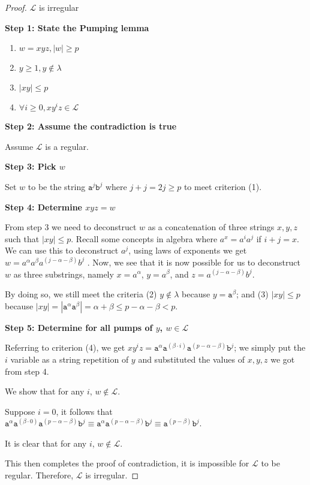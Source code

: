 \begin{proof}
    $\mathcal{L}$ is irregular

    \textbf{Step 1: State the Pumping lemma}
    \begin{enumerate}
        \item $w=xyz, |w| \geq p$
        \item $y\geq 1, y\notin\lambda$
        \item $|xy|\leq p$
        \item $\forall i\geq 0, xy^iz\in\mathcal{L}$
    \end{enumerate}
    
    \textbf{Step 2: Assume the contradiction is true}
    
    Assume $\mathcal{L}$ is a regular. 
    
    \textbf{Step 3: Pick $w$}
    
    Set $w$ to be the string $\texttt{a}^j \texttt{b}^j$ where $j+j=2j \geq p$ to meet criterion (1). 
    
    \textbf{Step 4: Determine $xyz=w$}
    
    From step 3 we need to deconstruct $w$ as a concatenation of three strings $x,y,z$ such that $|xy| \leq p$. Recall some concepts in algebra where $a^x =a^ia^j$ if $i+j=x$. We can use this to deconstruct $a^j$, using laws of exponents we get $w=a^\alpha a^\beta a^{(j-\alpha-\beta)}b^j$ . Now, we see that it is now possible for us to deconstruct $w$ as three substrings, namely $x=a^\alpha$, $y=a^\beta$, and $z=a^{(j-\alpha-\beta)}b^j$.
    
    By doing so, we still meet the criteria (2) $y\notin \lambda$ because $y=\texttt{a}^\beta$; and (3) $|xy|\leq p$ because $|xy|=|\texttt{a}^\alpha \texttt{a}^\beta| = \alpha+\beta \leq p-\alpha -\beta <p$. 
    
    \textbf{Step 5: Determine for all pumps of $y$, $w\in \mathcal{L}$}
    
    Referring to criterion (4), we get $xy^iz = \texttt{a}^\alpha \texttt{a}^{(\beta \cdot i)} \texttt{a}^{(p-\alpha-\beta)}\texttt{b}^j$; we simply put the $i$ variable as a string repetition of $y$ and substituted the values of $x,y,z$ we got from step 4. 

    We show that for any $i$, $w\notin \mathcal{L}$.

    Suppose $i=0$, it follows that $\texttt{a}^\alpha \texttt{a}^{(\beta \cdot 0)} \texttt{a}^{(p-\alpha-\beta)}\texttt{b}^j \equiv \texttt{a}^\alpha \texttt{a}^{(p-\alpha-\beta)}\texttt{b}^j \equiv \texttt{a}^{(p-\beta)}\texttt{b}^j$. 
    
    It is clear that for any $i$, $w\notin \mathcal{L}$.
    
    This then completes the proof of contradiction, it is impossible for $\mathcal{L}$ to be regular. Therefore, $\mathcal{L}$ is irregular. 
\end{proof}

